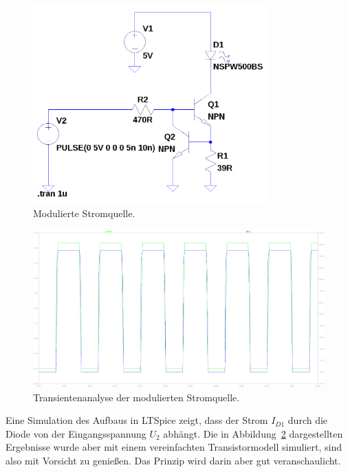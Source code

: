 \documentclass[12pt,a4paper]{article}
\begin{document}
\begin{figure}[H]
  \centering
    \includegraphics[width=0.8\textwidth]{../spice/modulated_current_source.png}
  \caption{Modulierte Stromquelle.}
  \label{fig:modulated_current_source}
\end{figure}

\begin{figure}[H]
  \centering
    \includegraphics[width=1.0\textwidth]{../spice/current_input_v_current_out_trans.png}
  \caption{Transientenanalyse der modulierten Stromquelle.}
  \label{fig:modulated_current_source_plot}
\end{figure}


Eine Simulation des Aufbaus in LTSpice zeigt, dass der Strom $I_{D1}$ durch die Diode von der Eingangsspannung $U_2$ abhängt. Die in Abbildung~\ref{fig:modulated_current_source_plot} dargestellten Ergebnisse wurde aber mit einem vereinfachten Transistormodell simuliert, sind also mit Vorsicht zu genießen. Das Prinzip wird darin aber gut veranschaulicht.
\end{document}

